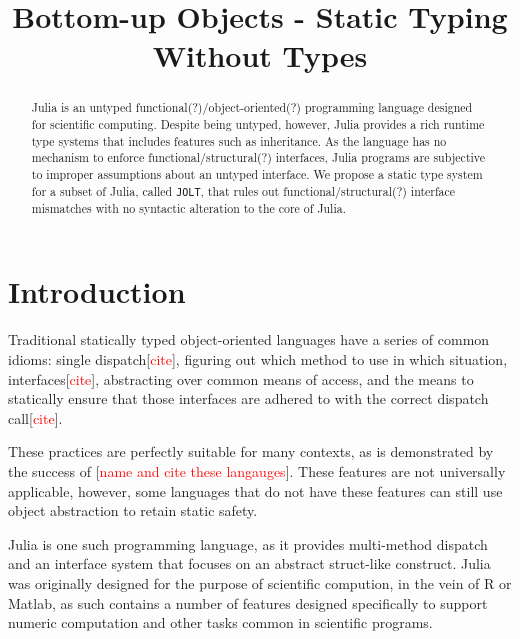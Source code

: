\documentclass[preprint]{sigplanconf}
\newcommand{\xt}[1]{\texttt{#1}}
\newcommand{\jolt}{\xt{JOLT}}
\begin{document}
\title{Bottom-up Objects - Static Typing Without Types} 
\maketitle

\begin{abstract}
Julia is an untyped functional(?)/object-oriented(?) programming language designed for scientific computing. 
Despite being untyped, however, Julia provides a rich runtime type systems that includes features such as  
inheritance. As the language has no mechanism to enforce functional/structural(?) interfaces, Julia programs 
are subjective to improper assumptions about an untyped interface. We propose a static type system for a 
subset of Julia, called \jolt, that rules out functional/structural(?) interface mismatches
with no syntactic alteration to the core of Julia.
\end{abstract}


\section{Introduction}

Traditional statically typed object-oriented languages have a series of
common idioms: single dispatch[\textcolor{red}{cite}], figuring out which method
to use in which situation, interfaces[\textcolor{red}{cite}], abstracting over 
common means of access, and the means to statically
ensure that those interfaces are adhered to with the correct dispatch call[\textcolor{red}{cite}].

These practices are perfectly suitable for many contexts,
as is demonstrated by the success of [\textcolor{red}{name and cite these langauges}].
These features are not universally applicable, however, some languages that do not have these features
can still use object abstraction to retain static safety.

Julia is one such programming language, as it provides multi-method dispatch 
and an interface system that focuses on an abstract struct-like construct. 
Julia was originally designed for the purpose of scientific compution, in the vein of 
R or Matlab, as such contains a number of features designed specifically to support 
numeric computation and other tasks common in scientific programs.
\end{document}
